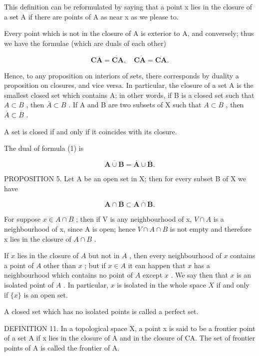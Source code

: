 This definition can be reformulated by saying that a point x lies in the closure of a set A if there are points of A as near x as we please to.

Every point which is not in the closure of A is exterior to A, and conversely; thus we have the formulae (which are duals of each other)

\[
\mathbf {C} \overline {{\mathbf {A}}} = \mathring {\mathbf {C} \mathbf {A}}, \quad \mathbf {C} \mathring {\mathbf {A}} = \overline {{\mathbf {C} \mathbf {A}}}.\tag{2}
\]

Hence, to any proposition on interiors of sets, there corresponds by duality a proposition on closures, and vice versa. In particular, the closure of a set A is the smallest closed set which contains A; in other words, if B is a closed set such that \(A \subset B\) , then \(\overline{A} \subset B\) . If A and B are two subsets of X such that \(A \subset B\) , then \(\overline{A} \subset \overline{B}\) .

A set is closed if and only if it coincides with its closure.

The dual of formula (1) is

\[
\overline {{{\mathbf {A} \cup \mathbf {B}}}} = \overline {{{\mathbf {A}}}} \cup \overline {{{\mathbf {B}}}}.\tag{3}
\]

PROPOSITION 5. Let A be an open set in X; then for every subset B of X we have

\[
\mathbf {A} \cap \overline {{\mathbf {B}}} \subset \overline {{\mathbf {A} \cap \mathbf {B}}}.\tag{4}
\]

For suppose \(x \in A \cap \overline{B}\) ; then if V is any neighbourhood of x, \(V \cap A\) is a neighbourhood of x, since A is open; hence \(V \cap A \cap B\) is not empty and therefore x lies in the closure of \(A \cap B\) .

If \(x\) lies in the closure of \(A\) but not in \(A\) , then every neighbourhood of \(x\) contains a point of \(A\) other than \(x\) ; but if \(x \in A\) it can happen that \(x\) has a neighbourhood which contains no point of \(A\) except \(x\) . We say then that \(x\) is an isolated point of \(A\) . In particular, \(x\) is isolated in the whole space \(X\) if and only if \(\{x\}\) is an open set.

A closed set which has no isolated points is called a perfect set.

DEFINITION 11. In a topological space X, a point x is said to be a frontier point of a set A if x lies in the closure of A and in the closure of CA. The set of frontier points of A is called the frontier of A.

